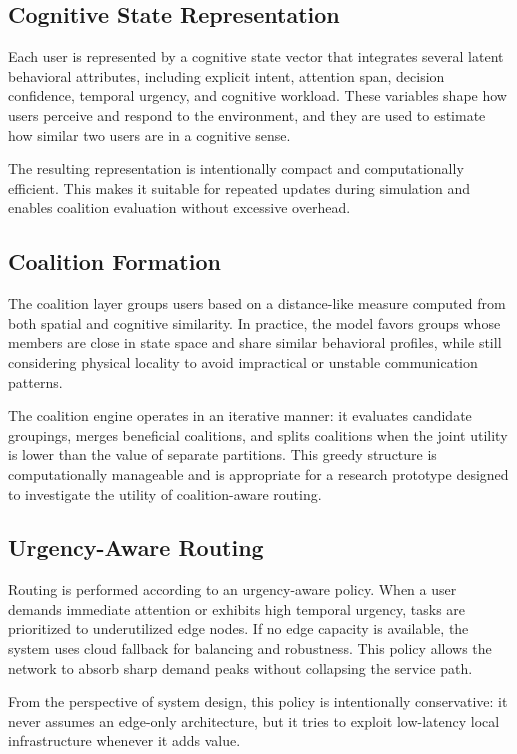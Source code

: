 \documentclass[11pt]{article}
\begin{document}
\subsection{Cognitive State Representation}
Each user is represented by a cognitive state vector that integrates several latent behavioral attributes, including explicit intent, attention span, decision confidence, temporal urgency, and cognitive workload. These variables shape how users perceive and respond to the environment, and they are used to estimate how similar two users are in a cognitive sense.

The resulting representation is intentionally compact and computationally efficient. This makes it suitable for repeated updates during simulation and enables coalition evaluation without excessive overhead.

\subsection{Coalition Formation}
The coalition layer groups users based on a distance-like measure computed from both spatial and cognitive similarity. In practice, the model favors groups whose members are close in state space and share similar behavioral profiles, while still considering physical locality to avoid impractical or unstable communication patterns.

The coalition engine operates in an iterative manner: it evaluates candidate groupings, merges beneficial coalitions, and splits coalitions when the joint utility is lower than the value of separate partitions. This greedy structure is computationally manageable and is appropriate for a research prototype designed to investigate the utility of coalition-aware routing.

\subsection{Urgency-Aware Routing}
Routing is performed according to an urgency-aware policy. When a user demands immediate attention or exhibits high temporal urgency, tasks are prioritized to underutilized edge nodes. If no edge capacity is available, the system uses cloud fallback for balancing and robustness. This policy allows the network to absorb sharp demand peaks without collapsing the service path.

From the perspective of system design, this policy is intentionally conservative: it never assumes an edge-only architecture, but it tries to exploit low-latency local infrastructure whenever it adds value.
\end{document}
